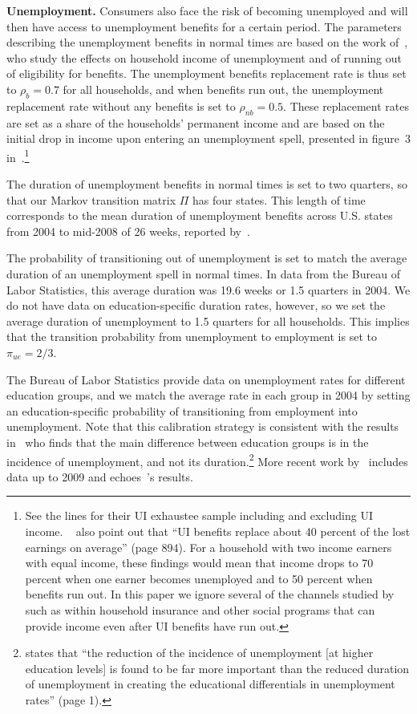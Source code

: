 \documentclass[\latexroot/\projectname]{subfiles}
\begin{document}
\textbf{Unemployment.} Consumers also face the risk of becoming unemployed and will then have access to unemployment benefits for a certain period.
The parameters describing the unemployment benefits in normal times are based on the work of~\cite{rothstein2017scraping}, who study the effects on household income of unemployment and of running out of eligibility for benefits.
The unemployment benefits replacement rate is thus set to $\rho_b=0.7$ for all households, and when benefits run out, the unemployment replacement rate without any benefits is set to $\rho_{nb}=0.5$.
These replacement rates are set as a share of the households' permanent income and are based on the initial drop in income upon entering an unemployment spell, presented in figure~3 in~\cite{rothstein2017scraping}.\footnote{See the lines for their UI exhaustee sample including and excluding UI income.
  ~\cite{rothstein2017scraping} also point out that ``UI benefits replace about 40 percent of the lost earnings on average'' (page 894).
  For a household with two income earners with equal income, these findings would mean that income drops to 70 percent when one earner becomes unemployed and to 50 percent when benefits run out.
  In this paper we ignore several of the channels studied by~\cite{rothstein2017scraping} such as within household insurance and other social programs that can provide income even after UI benefits have run out.}

The duration of unemployment benefits in normal times is set to two quarters, so that our Markov transition matrix $\Pi$ has four states.
This length of time corresponds to the mean duration of unemployment benefits across U.S.
states from 2004 to mid-2008 of 26 weeks, reported by~\cite{rothstein2017scraping}.

The probability of transitioning out of unemployment is set to match the average duration of an unemployment spell in normal times.
In data from the Bureau of Labor Statistics, this average duration was 19.6 weeks or 1.5 quarters in 2004. We do not have data on  education-specific duration rates, however, so we set the average duration of unemployment to 1.5 quarters for all households. This implies that the transition probability from unemployment to employment is set to $\pi_{ue}=2/3$.

The Bureau of Labor Statistics provide data on unemployment rates for different education groups, and we match the average rate in each group in 2004 by setting an education-specific probability of transitioning from employment into unemployment.
Note that this calibration strategy is consistent with the results in~\cite{mincer1991education} who finds that the main difference between education groups is in the incidence of unemployment, and not its duration.\footnote{\cite{mincer1991education} states that ``the reduction of the incidence of unemployment [at higher education levels] is found to be far more important than the reduced duration of unemployment in creating the educational differentials in unemployment rates'' (page 1).} More recent work by~\cite{elsby2010labor} includes data up to 2009 and echoes~\citeauthor{mincer1991education}'s results.
\end{document}
